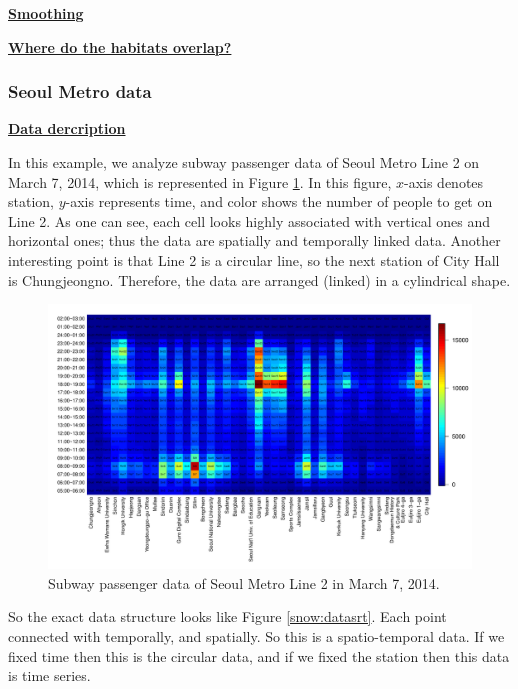 \documentclass[preprint, review, 12pt]{article}
\theoremstyle{definition}
\theoremstyle{remark}
\begin{document}
\noindent\textbf{\underline{Smoothing}}

\noindent\textbf{\underline{Where do the habitats overlap?}}

\subsubsection{Seoul Metro data}
\noindent\textbf{\underline{Data dercription}}

In this example, we analyze subway passenger data of Seoul Metro Line 2 on March 7, 2014, which is represented in Figure \ref{snow:subway_in_0}. In this figure, $x$-axis denotes station, $y$-axis represents time, and color shows the number of people to get on Line 2. As one can see, each cell looks highly associated with vertical ones and horizontal ones; thus the data are spatially and temporally linked data. Another interesting point is that Line 2 is a circular line, so the next station of City Hall is Chungjeongno. Therefore, the data are arranged (linked) in a cylindrical shape.

\begin{figure}
	\centering
	\includegraphics[width=1.05\textwidth]{Fig/In_data.pdf}
	\vspace{-13mm}
	\caption{Subway passenger data of Seoul Metro Line 2 in March 7, 2014.}
	\label{snow:subway_in_0}
\end{figure}	

So the exact data structure looks like Figure \ref{snow:datasrt}. Each point connected with temporally, and spatially. So this is a spatio-temporal data. If we fixed time then this is the circular data, and if we fixed the station then this data is time series. 
\end{document}
